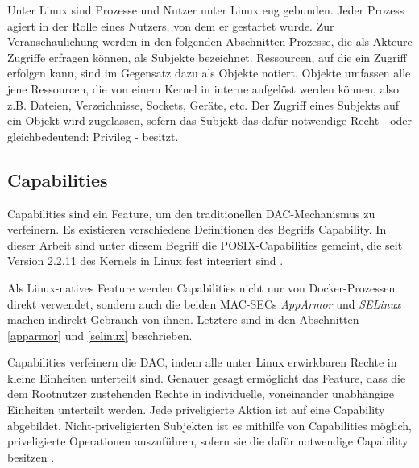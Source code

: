 \documentclass[../main.tex]{subfiles}
\begin{document}
		Unter Linux sind Prozesse und Nutzer unter Linux eng gebunden. Jeder Prozess agiert in der Rolle eines Nutzers, von dem er gestartet wurde.	Zur Veranschaulichung werden in den folgenden Abschnitten Prozesse, die als Akteure Zugriffe erfragen können, als Subjekte bezeichnet. Ressourcen, auf die ein Zugriff erfolgen kann, sind im Gegensatz dazu als Objekte notiert. Objekte umfassen alle jene Ressourcen, die von einem Kernel in interne  aufgelöst werden können, also z.B. Dateien, Verzeichnisse, Sockets, Geräte, etc. Der Zugriff eines Subjekts auf ein Objekt wird zugelassen, sofern das Subjekt das dafür notwendige Recht - oder gleichbedeutend: Privileg - besitzt.



    \subsection{Capabilities}
		\label{capabilities}
			Capabilities sind ein Feature, um den traditionellen DAC-Mechanismus zu verfeinern. Es existieren verschiedene Definitionen des Begriffs \glqq{}Capability\grqq{}. In dieser Arbeit sind unter diesem Begriff die POSIX-Capabilities gemeint, die seit Version 2.2.11 des Kernels in Linux fest integriert sind \cite[S.42]{SELinuxApparmor}.

			Als Linux-natives Feature werden Capabilities nicht nur von Docker-Prozessen direkt verwendet, sondern auch die beiden \acrshort{MAC-SEC}s \emph{AppArmor} und \emph{SELinux} machen indirekt Gebrauch von ihnen. Letztere sind in den Abschnitten \ref{apparmor} und \ref{selinux} beschrieben.

			Capabilities verfeinern die DAC, indem alle unter Linux erwirkbaren Rechte in kleine Einheiten unterteilt sind. Genauer gesagt ermöglicht das Feature, dass die dem Rootnutzer zustehenden Rechte in individuelle, voneinander unabhängige Einheiten unterteilt werden. Jede priveligierte Aktion ist auf eine Capability abgebildet. Nicht-priveligierten Subjekten ist es mithilfe von Capabilities möglich, priveligierte Operationen auszuführen, sofern sie die dafür notwendige Capability besitzen \cite[S.33]{linuxInterface}\cite[S.39]{SELinuxApparmor}.
\end{document}

